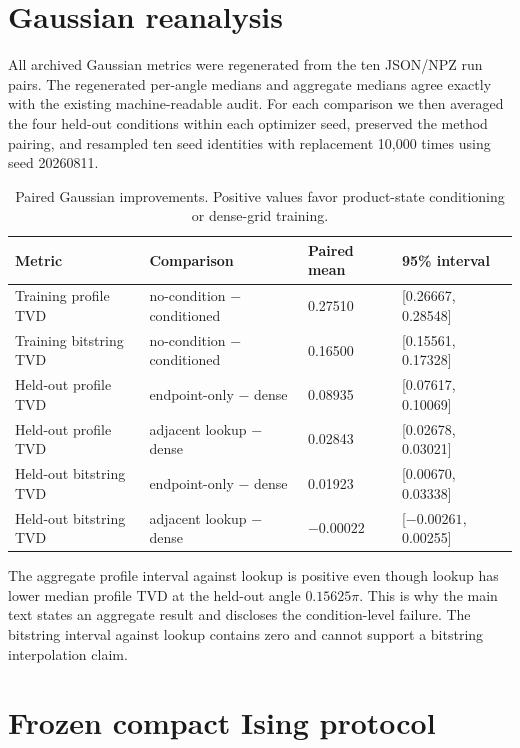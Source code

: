 \section{Gaussian reanalysis}
\label{app:gaussian}

All archived Gaussian metrics were regenerated from the ten JSON/NPZ run
pairs.  The regenerated per-angle medians and aggregate medians agree exactly
with the existing machine-readable audit.  For each comparison we then
averaged the four held-out conditions within each optimizer seed, preserved
the method pairing, and resampled ten seed identities with replacement 10,000
times using seed 20260811.

\begin{table}[t]
\centering
\caption{Paired Gaussian improvements.  Positive values favor product-state
conditioning or dense-grid training.}
\label{tab:gaussian-paired}
\begin{tabular}{llll}
\toprule
Metric & Comparison & Paired mean & 95\% interval \\
\midrule
Training profile TVD & no-condition $-$ conditioned & 0.27510 & [0.26667, 0.28548] \\
Training bitstring TVD & no-condition $-$ conditioned & 0.16500 & [0.15561, 0.17328] \\
Held-out profile TVD & endpoint-only $-$ dense & 0.08935 & [0.07617, 0.10069] \\
Held-out profile TVD & adjacent lookup $-$ dense & 0.02843 & [0.02678, 0.03021] \\
Held-out bitstring TVD & endpoint-only $-$ dense & 0.01923 & [0.00670, 0.03338] \\
Held-out bitstring TVD & adjacent lookup $-$ dense & $-0.00022$ & [$-0.00261$, 0.00255] \\
\bottomrule
\end{tabular}
\end{table}

The aggregate profile interval against lookup is positive even though lookup
has lower median profile TVD at the held-out angle $0.15625\pi$.  This is why
the main text states an aggregate result and discloses the condition-level
failure.  The bitstring interval against lookup contains zero and cannot
support a bitstring interpolation claim.

\section{Frozen compact Ising protocol}
\label{app:ising-protocol}

